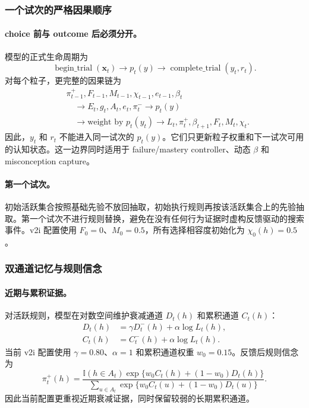 \subsubsection{一个试次的严格因果顺序}

\paragraph{choice 前与 outcome 后必须分开。}
模型的正式生命周期为
\begin{equation}
\operatorname{begin\_trial}(\mathbf x_t)
\longrightarrow p_t(y)
\longrightarrow
\operatorname{complete\_trial}(y_t,r_t).
\label{eq:model0811-lifecycle}
\end{equation}
对每个粒子，更完整的因果链为
\begin{equation}
\begin{aligned}
&\pi^+_{t-1},F_{t-1},M_{t-1},
\chi_{t-1},e_{t-1},\beta_t
\\
&\quad\longrightarrow
E_t,g_t,A_t,e_t,\pi^-_t
\longrightarrow p_t(y)
\\
&\quad\longrightarrow
\text{weight by }p_t(y_t)
\longrightarrow
L_t,\pi^+_t,\beta_{t+1},F_t,M_t,\chi_t.
\end{aligned}
\label{eq:model0811-causal-order}
\end{equation}
因此，$y_t$ 和 $r_t$ 不能进入同一试次的 $p_t(y)$。它们只更新粒子权重和下一试次可用的认知状态。这一边界同时适用于 failure/mastery controller、动态 $\beta$ 和 misconception capture。

\paragraph{第一个试次。}
初始活跃集合按照基础先验不放回抽取，初始执行规则再按该活跃集合上的先验抽取。第一个试次不进行规则替换，避免在没有任何行为证据时虚构反馈驱动的搜索事件。v2i 配置使用 $F_0=0$、$M_0=0.5$，所有选择相容度初始化为 $\chi_0(h)=0.5$。


\subsubsection{双通道记忆与规则信念}

\paragraph{近期与累积证据。}
对活跃规则，模型在对数空间维护衰减通道 $D_t(h)$ 和累积通道 $C_t(h)$：
\begin{align}
D_t(h)
&=\gamma D^-_t(h)+\alpha\log L_t(h),
\nonumber\\
C_t(h)
&=C^-_t(h)+\alpha\log L_t(h).
\label{eq:model0811-dual-memory}
\end{align}
当前 v2i 配置使用 $\gamma=0.80$、$\alpha=1$ 和累积通道权重 $w_0=0.15$。反馈后规则信念为
\begin{equation}
\pi^+_t(h)
=
\frac{\mathbb I(h\in A_t)
\exp\{w_0C_t(h)+(1-w_0)D_t(h)\}}
{\sum_{u\in A_t}
\exp\{w_0C_t(u)+(1-w_0)D_t(u)\}}.
\label{eq:model0811-memory-posterior}
\end{equation}
因此当前配置更重视近期衰减证据，同时保留较弱的长期累积通道。

